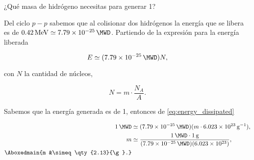 \documentclass[./../main.tex]{subfiles}
\begin{document}
	\begin{exercise}
		¿Qué masa de hidrógeno necesitas para generar \qty[inter-unit-product=]{1}{\MWD}?

		\begin{solution}
			Del ciclo \(p-p\) sabemos que al colisionar dos hidrógenos la energía que se libera es de \(\qty{0.42}{\MeV} \simeq \qty{7.79e-25}{\MWD}\). Partiendo de la expresión para la energía liberada

			\begin{equation}
				E \simeq (\qty{7.79e-25}{\MWD})N,
				\label{eq:energy_dissipated}
			\end{equation}

			con \(N\) la cantidad de núcleos, \idest

			\begin{equation*}
				N = m \cdot \dfrac{N_{A}}{A}.
			\end{equation*}

			Sabemos que la energía generada es de \qty{1}{\MWD}, entonces de \cref{eq:energy_dissipated}

			\begin{align*}
				\qty{1}{\MWD} &\simeq (\qty{7.79e-25}{\MWD})(m \cdot \qty{6.023e23}{\per\g}),\\
				m &\simeq \dfrac{\qty{1}{\MWD}\cdot\qty{1}{\g}}{(\qty{7.79e-25}{\MWD})(\num{6.023e23})},\\
				\Aboxedmain{m &\simeq \qty{2.13}{\g}.}
			\end{align*}
		\end{solution}
	\end{exercise}
\end{document}
